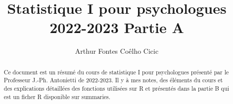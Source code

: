 \documentclass{report}
\title{Statistique I pour psychologues 2022-2023 Partie A}
\author{Arthur Fontes Coêlho Cicic}
\begin{document}
\maketitle

\begin{abstract}
Ce document est un  résumé du cours de statistique I pour psychologues présenté par le Professeur J.-Ph. Antonietti de 2022-2023. Il y à mes notes, des éléments du cours et des explications détaillées des fonctions utilisées sur R et présentés dans la partie B qui est un ficher R disponible sur summaries. 
\end{abstract}
\end{document}
